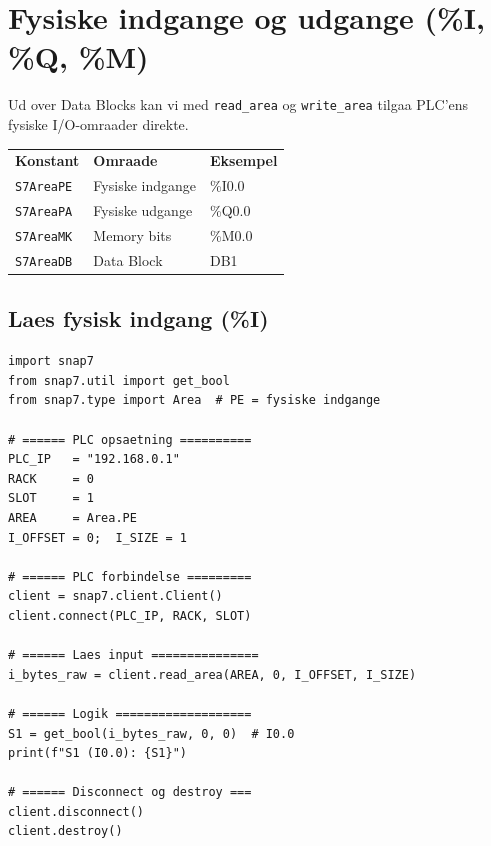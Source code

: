 \documentclass[12pt, a4paper]{article}
\begin{document}
\clearpage
\section{Fysiske indgange og udgange (\%I, \%Q, \%M)}

Ud over Data Blocks kan vi med \texttt{read\_area} og \texttt{write\_area}
tilgaa PLC'ens fysiske I/O-omraader direkte.

\begin{tcolorbox}[infobox, title={\faInfoCircle\quad Omraade-konstanter i snap7}]
\begin{tabular}{lll}
\textbf{Konstant} & \textbf{Omraade} & \textbf{Eksempel} \\
\texttt{S7AreaPE} & Fysiske indgange & \%I0.0 \\
\texttt{S7AreaPA} & Fysiske udgange  & \%Q0.0 \\
\texttt{S7AreaMK} & Memory bits      & \%M0.0 \\
\texttt{S7AreaDB} & Data Block       & DB1 \\
\end{tabular}
\end{tcolorbox}

\subsection{Laes fysisk indgang (\%I)}

\begin{tcolorbox}[pythonbox, title={\faPython\quad Kode 2 --- Laes fysisk indgang \%I0.0}]
\begin{verbatim}
import snap7
from snap7.util import get_bool
from snap7.type import Area  # PE = fysiske indgange

# ====== PLC opsaetning ==========
PLC_IP   = "192.168.0.1"
RACK     = 0
SLOT     = 1
AREA     = Area.PE
I_OFFSET = 0;  I_SIZE = 1

# ====== PLC forbindelse =========
client = snap7.client.Client()
client.connect(PLC_IP, RACK, SLOT)

# ====== Laes input ===============
i_bytes_raw = client.read_area(AREA, 0, I_OFFSET, I_SIZE)

# ====== Logik ===================
S1 = get_bool(i_bytes_raw, 0, 0)  # I0.0
print(f"S1 (I0.0): {S1}")

# ====== Disconnect og destroy ===
client.disconnect()
client.destroy()
\end{verbatim}
\end{tcolorbox}
\end{document}

